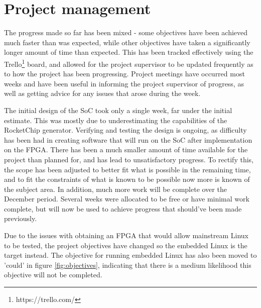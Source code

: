 \section{Project management}
The progress made so far has been mixed - some objectives have been achieved much faster than was expected, while other objectives have taken a significantly longer amount of time than expected. This has been tracked effectively using the Trello\footnote{https://trello.com/} board, and allowed for the project supervisor to be updated frequently as to how the project has been progressing. Project meetings have occurred most weeks and have been useful in informing the project supervisor of progress, as well as getting advice for any issues that arose during the week.

The initial design of the SoC took only a single week, far under the initial estimate. This was mostly due to underestimating the capabilities of the RocketChip generator. Verifying and testing the design is ongoing, as difficulty has been had in creating software that will run on the SoC after implementation on the FPGA. There has been a much smaller amount of time available for the project than planned for, and has lead to unsatisfactory progress. To rectify this, the scope has been adjusted to better fit what is possible in the remaining time, and to fit the constraints of what is known to be possible now more is known of the subject area. In addition, much more work will be complete over the December period. Several weeks were allocated to be free or have minimal work complete, but will now be used to achieve progress that should've been made previously.

Due to the issues with obtaining an FPGA that would allow mainstream Linux to be tested, the project objectives have changed so the embedded Linux is the target instead. The objective for running embedded Linux has also been moved to 'could' in figure \ref{fig:objectives}, indicating that there is a medium likelihood this objective will not be completed.

